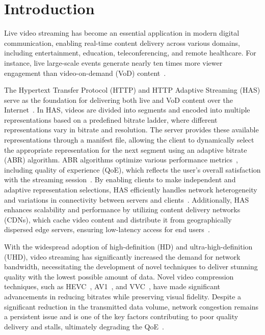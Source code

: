 \begin{abstract}
Abstract.
\end{abstract}

\section{Introduction}
Live video streaming has become an essential application in modern digital communication, enabling real-time content delivery across various domains, including entertainment, education, teleconferencing, and remote healthcare. 
For instance, live large-scale events generate nearly ten times more viewer engagement than video-on-demand (VoD) content~\cite{rldish}.

The Hypertext Transfer Protocol (HTTP) and HTTP Adaptive Streaming (HAS) serve as the foundation for delivering both live and VoD content over the Internet~\cite{8424813}. In HAS, videos are divided into segments and encoded into multiple representations based on a predefined bitrate ladder, where different representations vary in bitrate and resolution. The server provides these available representations through a manifest file, allowing the client to dynamically select the appropriate representation for the next segment using an adaptive bitrate (ABR) algorithm. ABR algorithms optimize various performance metrics~\cite{10229083}, including quality of experience (QoE), which reflects the user’s overall satisfaction with the streaming session~\cite{zuo2022abr}. By enabling clients to make independent and adaptive representation selections, HAS efficiently handles network heterogeneity and variations in connectivity between servers and clients~\cite{8424813}. Additionally, HAS enhances scalability and performance by utilizing content delivery networks (CDNs), which cache video content and distribute it from geographically dispersed edge servers, ensuring low-latency access for end users~\cite{content_delivery_2002}.

With the widespread adoption of high-definition (HD) and ultra-high-definition (UHD), video streaming has significantly increased the demand for network bandwidth, necessitating the development of novel techniques to deliver stunning quality with the lowest possible amount of data. Novel video compression techniques, such as HEVC~\cite{h265_overview}, AV1~\cite{av1_overview}, and VVC~\cite{vvc_overview}, have made significant advancements in reducing bitrates while preserving visual fidelity. Despite a significant reduction in the transmitted data volume, network congestion remains a persistent issue and is one of the key factors contributing to poor quality delivery and stalls, ultimately degrading the QoE~\cite{}.

